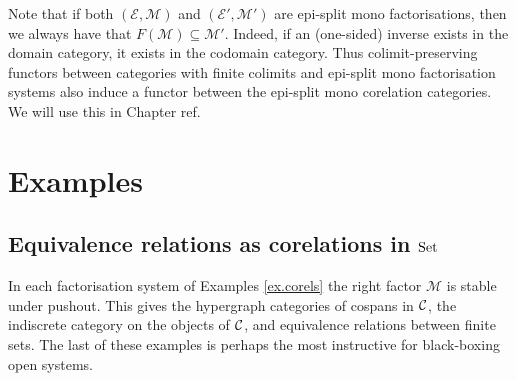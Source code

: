 \begin{example}
Note that if both $(\mathcal E, \mathcal M)$ and $(\mathcal E', \mathcal M')$
are epi-split mono factorisations, then we always have that $F(\mathcal M)
\subseteq \mathcal M'$. Indeed, if an (one-sided) inverse exists in the domain
category, it exists in the codomain category. Thus colimit-preserving functors
between categories with finite colimits and epi-split mono factorisation systems
also induce a functor between the epi-split mono corelation categories. We will
use this in Chapter ref.
\end{example}

\section{Examples}
\subsection{Equivalence relations as corelations in $\mathrm{Set}$}
\label{ssec.equivrels}
  
In each factorisation system of Examples \ref{ex.corels} the right factor
  $\mathcal M$ is stable under pushout.  This gives the hypergraph categories of
  cospans in $\mathcal C$, the indiscrete category on the objects of $\mathcal C$, and
  equivalence relations between finite sets. The last of these examples is
  perhaps the most instructive for black-boxing open systems. 
  
